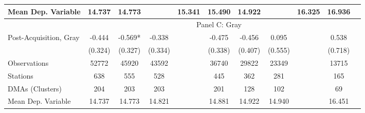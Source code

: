 {\begin{tabular}{l*{10}{c}}
Mean Dep. Variable&   14.737   &   14.773   &         &   15.341   &   15.490   &   14.922   &         &   16.325   &   16.936   \\
\midrule \ & \multicolumn{9}{c}{Panel C: Gray} \\\cmidrule(lr){2-10}
Post-Acquisition, Gray&   -0.444   &   -0.569*  &   -0.338   &         &   -0.475   &   -0.456   &    0.095   &         &    0.538   \\
                &  (0.324)   &  (0.327)   &  (0.334)   &         &  (0.338)   &  (0.407)   &  (0.555)   &         &  (0.718)   \\
\midrule
Observations    &    52772   &    45920   &    43592   &         &    36740   &    29822   &    23349   &         &    13715   \\
Stations        &      638   &      555   &      528   &         &      445   &      362   &      281   &         &      165   \\
DMAs (Clusters) &      204   &      203   &      203   &         &      201   &      128   &      102   &         &       69   \\
Mean Dep. Variable&   14.737   &   14.773   &   14.821   &         &   14.881   &   14.922   &   14.940   &         &   16.451   \\
\bottomrule \end{tabular}}

